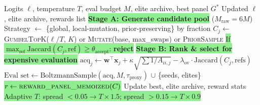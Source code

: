 \documentclass[8pt]{article}
\begin{document}
\begin{tcolorbox}[
    title={\textbf{Algorithm 1b:} Explore Best --- Two-stage CEM with linear surrogate UCB},
    colback=lightgreen!20, colframe=added!80, fonttitle=\small\bfseries,
    boxrule=0.5pt, arc=2pt, left=4pt, right=4pt, top=2pt, bottom=2pt
]
\begin{algorithmic}[1]
\small
\Require Logits $\boldsymbol{\ell}$, temperature $T$, eval budget $M$, elite archive, best panel $G^*$
\Ensure Updated $\boldsymbol{\ell}$, elite archive, rewards list
\State \colorbox{lightgreen}{\textbf{Stage A: Generate candidate pool}} ($M_\text{raw} = 6M$)
    \State Strategy $\gets$ \{global, local-mutation, prior-preserving\} by fraction
    \State $C_j \gets$ \textsc{GumbelTopK}($\boldsymbol{\ell}/T$, $K$) or \textsc{Mutate}(base, max\_swaps) or \textsc{PriorSample}
    \State \colorbox{lightgreen}{If $\max_\text{ref} \text{Jaccard}(C_j, \text{ref}) \geq \theta_\text{accept}$: \textbf{reject}} 
\EndFor
\State \colorbox{lightgreen}{\textbf{Stage B: Rank \& select for expensive evaluation}}
\State $\text{acq}_j \gets \mathbf{w}^\top \mathbf{x}_j + \kappa \sqrt{\sum 1/A_{ii,j}} - \lambda_\text{ov} \cdot \text{Jaccard}(C_j, \text{refs})$ 
\State $\text{Eval set} \gets \text{BoltzmannSample}(\text{acq}, M, \tau_\text{proxy})$ $\cup$ \{seeds, elites\}
    \State \colorbox{lightgreen}{$r \gets \textsc{reward\_panel\_memoized}(C)$} 
    \State Update best, elite archive, reward stats
\EndFor
\State \colorbox{lightgreen}{Adaptive $T$: spread $< 0.05 \to T \times 1.5$; spread $> 0.15 \to T \times 0.9$}
\end{algorithmic}
\end{tcolorbox}

\vspace{4pt}
\end{document}
